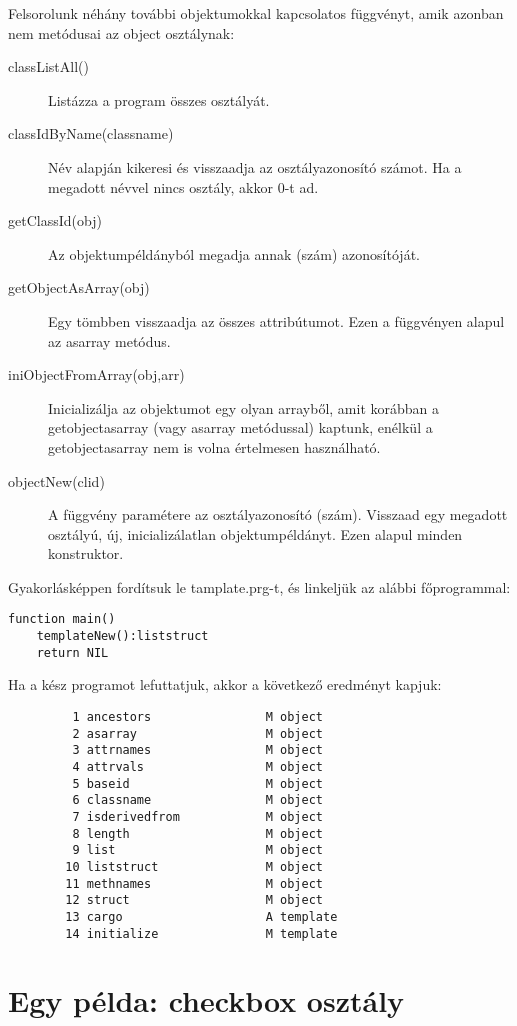Felsorolunk néhány további objektumokkal kapcsolatos
függvényt, amik azonban nem metódusai az object osztálynak:
\begin{description}
\item[classListAll()]
    Listázza a program összes osztályát.
\item[classIdByName(classname)]
    Név alapján kikeresi és visszaadja az osztályazonosító számot.
    Ha a megadott névvel nincs osztály, akkor 0-t ad.
\item[getClassId(obj)]
    Az objektumpéldányból megadja annak (szám) azonosítóját.
\item[getObjectAsArray(obj)]
    Egy tömbben visszaadja az összes attribútumot.
    Ezen a függvényen alapul az asarray metódus.
\item[iniObjectFromArray(obj,arr)]
    Inicializálja az objektumot egy olyan arrayből,
    amit korábban a getobjectasarray (vagy asarray metódussal) 
    kaptunk, enélkül a getobjectasarray nem is volna értelmesen 
    használható. 
\item[objectNew(clid)]
    A függvény paramétere az osztályazonosító (szám).
    Visszaad egy megadott osztályú, új, inicializálatlan 
    objektumpéldányt. Ezen alapul minden konstruktor.
\end{description}


Gyakorlásképpen fordítsuk le tamplate.prg-t, 
és linkeljük az alábbi főprogrammal:
\begin{verbatim}
function main()
    templateNew():liststruct
    return NIL
\end{verbatim}
Ha a kész programot lefuttatjuk, akkor a következő eredményt kapjuk:
\begin{verbatim}
         1 ancestors                M object
         2 asarray                  M object
         3 attrnames                M object
         4 attrvals                 M object
         5 baseid                   M object
         6 classname                M object
         7 isderivedfrom            M object
         8 length                   M object
         9 list                     M object
        10 liststruct               M object
        11 methnames                M object
        12 struct                   M object
        13 cargo                    A template
        14 initialize               M template
\end{verbatim}

\section{Egy példa: checkbox osztály}

